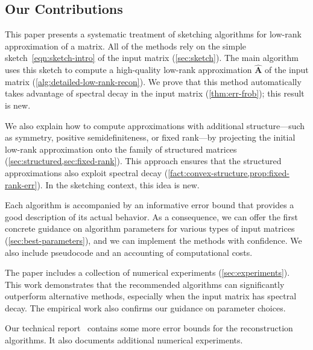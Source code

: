 \documentclass[final]{siamart1116}
\numberwithin{equation}{section}
\numberwithin{theorem}{section}
\numberwithin{figure}{section}
\newcommand{\mtx}[1]{\bm{#1}}
\begin{document}
\subsection{Our Contributions}
\label{sec:contributions}



This paper presents a systematic treatment of sketching algorithms
for low-rank approximation of a matrix.
All of the methods rely on the simple sketch~\cref{eqn:sketch-intro}
of the input matrix (\cref{sec:sketch}).
The main algorithm uses this sketch to compute a high-quality low-rank approximation $\hat{\mtx{A}}$
of the input matrix  (\cref{alg:detailed-low-rank-recon}).  We prove that this method automatically
takes advantage of spectral decay in the input matrix (\cref{thm:err-frob});
this result is new.

We also explain how to compute approximations
with additional structure---such as symmetry, positive semidefiniteness, or fixed rank---by
projecting the initial low-rank approximation onto the
family of structured matrices (\cref{sec:structured,sec:fixed-rank}).
This approach ensures that the structured approximations also exploit spectral decay
(\cref{fact:convex-structure,prop:fixed-rank-err}).  In the sketching context,
this idea is new.

Each algorithm is accompanied by an informative error bound
that provides a good description of its actual behavior.
As a consequence, we can offer the first concrete guidance on algorithm
parameters for various types of input matrices (\cref{sec:best-parameters}),
and we can implement the methods with confidence.
We also include pseudocode and an accounting of computational costs.


The paper includes a collection of numerical experiments (\cref{sec:experiments}).
This work demonstrates that the recommended algorithms
can significantly outperform alternative methods,
especially when the input matrix has spectral decay.
The empirical work also confirms our guidance on parameter choices.

Our technical report~\cite{TYUC17:Randomized-Single-View-TR}
contains some more error bounds for the reconstruction
algorithms.  It also documents additional numerical experiments.
\end{document}

